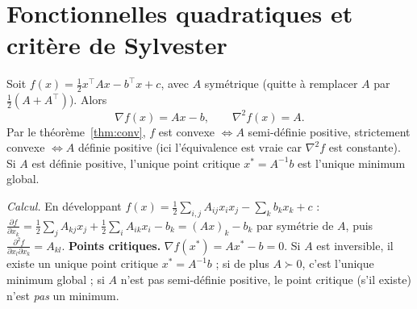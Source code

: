 \documentclass[a4paper,11pt]{report}
\theoremstyle{plain}
\theoremstyle{definition}
\theoremstyle{remark}
\newcommand{\grad}{\nabla}
\newcommand{\hess}{\nabla^2}
\newcommand{\T}{^{\!\top}}
\begin{document}
			
			\section{Fonctionnelles quadratiques et critère de Sylvester}
			Soit $f(x)=\frac12x\T Ax-b\T x+c$, avec $A$ symétrique (quitte à remplacer $A$ par $\frac12(A+A\T)$). Alors
			\[\grad f(x)=Ax-b,\qquad \hess f(x)=A.\]
			Par le théorème~\ref{thm:conv}, $f$ est convexe $\iff A$ semi-définie positive, strictement convexe $\iff A$ définie positive (ici l'équivalence est vraie car $\hess f$ est constante). Si $A$ est définie positive, l'unique point critique $x^*=A^{-1}b$ est l'unique minimum global.
			
			\emph{Calcul.} En développant $f(x)=\frac12\sum_{i,j}A_{ij}x_ix_j-\sum_kb_kx_k+c$ :
			$\frac{\partial f}{\partial x_k}=\frac12\sum_jA_{kj}x_j+\frac12\sum_iA_{ik}x_i-b_k=(Ax)_k-b_k$ par symétrie de $A$, puis $\frac{\partial^2f}{\partial x_l\partial x_k}=A_{kl}$.
			\textbf{Points critiques.} $\grad f(x^*)=Ax^*-b=0$. Si $A$ est inversible, il existe un unique point critique $x^*=A^{-1}b$ ; si de plus $A\succ0$, c'est l'unique minimum global ; si $A$ n'est pas semi-définie positive, le point critique (s'il existe) n'est \emph{pas} un minimum.
			
\end{document}
